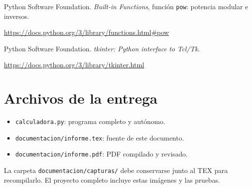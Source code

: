 \documentclass[11pt,a4paper]{article}
\begin{document}
Python Software Foundation. \textit{Built-in Functions}, función
\texttt{pow}: potencia modular e inversos.\par
\url{https://docs.python.org/3/library/functions.html#pow}

Python Software Foundation. \textit{tkinter: Python interface to Tcl/Tk}.\par
\url{https://docs.python.org/3/library/tkinter.html}

\section*{Archivos de la entrega}
\begin{itemize}
\item \texttt{calculadora.py}: programa completo y autónomo.
\item \texttt{documentacion/informe.tex}: fuente de este documento.
\item \texttt{documentacion/informe.pdf}: PDF compilado y revisado.
\end{itemize}
La carpeta \texttt{documentacion/capturas/} debe conservarse junto al TEX
para recompilarlo. El proyecto completo incluye estas imágenes y las pruebas.
\end{document}
